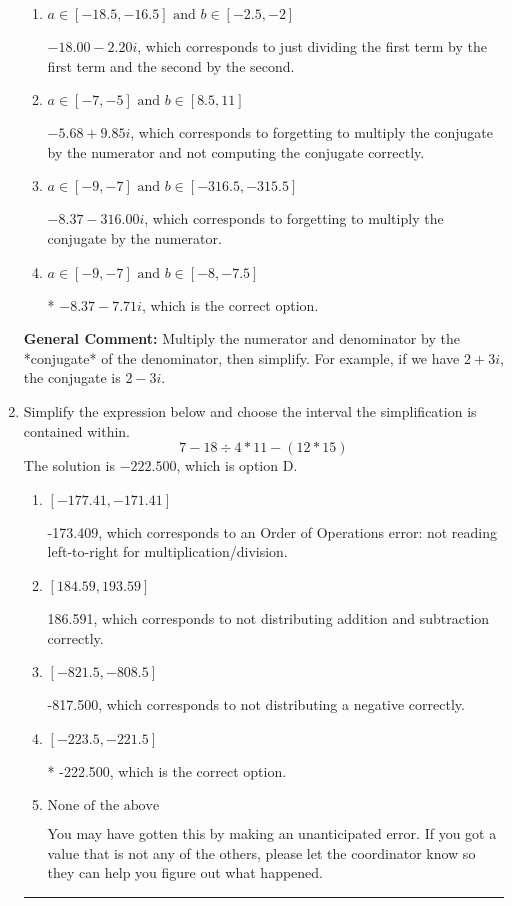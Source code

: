 \documentclass{extbook}[14pt]
\newcommand{\litem}[1]{\item #1

\rule{\textwidth}{0.4pt}}
\begin{document}
\begin{enumerate}
{\begin{enumerate}[label=\Alph*.]
 $-343.00  - 7.71 i$, which corresponds to forgetting to multiply the conjugate by the numerator and using a plus instead of a minus in the denominator.
\item \( a \in [-18.5, -16.5] \text{ and } b \in [-2.5, -2] \)

 $-18.00  - 2.20 i$, which corresponds to just dividing the first term by the first term and the second by the second.
\item \( a \in [-7, -5] \text{ and } b \in [8.5, 11] \)

 $-5.68  + 9.85 i$, which corresponds to forgetting to multiply the conjugate by the numerator and not computing the conjugate correctly.
\item \( a \in [-9, -7] \text{ and } b \in [-316.5, -315.5] \)

 $-8.37  - 316.00 i$, which corresponds to forgetting to multiply the conjugate by the numerator.
\item \( a \in [-9, -7] \text{ and } b \in [-8, -7.5] \)

* $-8.37  - 7.71 i$, which is the correct option.
\end{enumerate}

\textbf{General Comment:} Multiply the numerator and denominator by the *conjugate* of the denominator, then simplify. For example, if we have $2+3i$, the conjugate is $2-3i$.
}
\litem{
Simplify the expression below and choose the interval the simplification is contained within.
\[ 7 - 18 \div 4 * 11 - (12 * 15) \]The solution is \( -222.500 \), which is option D.\begin{enumerate}[label=\Alph*.]
\item \( [-177.41, -171.41] \)

 -173.409, which corresponds to an Order of Operations error: not reading left-to-right for multiplication/division.
\item \( [184.59, 193.59] \)

 186.591, which corresponds to not distributing addition and subtraction correctly.
\item \( [-821.5, -808.5] \)

 -817.500, which corresponds to not distributing a negative correctly.
\item \( [-223.5, -221.5] \)

* -222.500, which is the correct option.
\item \( \text{None of the above} \)

 You may have gotten this by making an unanticipated error. If you got a value that is not any of the others, please let the coordinator know so they can help you figure out what happened.
\end{enumerate}

}
\end{enumerate}
\end{document}
